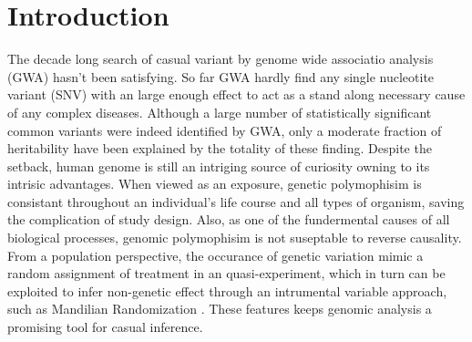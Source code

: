 \section{Introduction}
The decade long search of casual variant by genome wide associatio analysis (GWA) hasn't been satisfying. So far GWA hardly find any single nucleotite variant (SNV) with an large enough effect to act as a stand along necessary cause of any complex diseases. Although a large number of statistically significant common variants were indeed identified by GWA, only a moderate fraction of heritability have been explained by the totality of these finding\cite{GWA1, GWA2}. Despite the setback, human genome is still an intriging source of curiosity owning to its intrisic advantages. When viewed as an exposure, genetic polymophisim is consistant throughout an individual's life course and all types of organism, saving the complication of study design. Also, as one of the fundermental causes of all biological processes, genomic polymophisim is not suseptable to reverse causality. From a population perspective, the occurance of genetic variation mimic a random assignment of treatment in an quasi-experiment, which in turn can be exploited to infer non-genetic effect through an intrumental variable approach, such as Mandilian Randomization \cite{MR1, MR2}. These features keeps genomic analysis a promising tool for casual inference.

